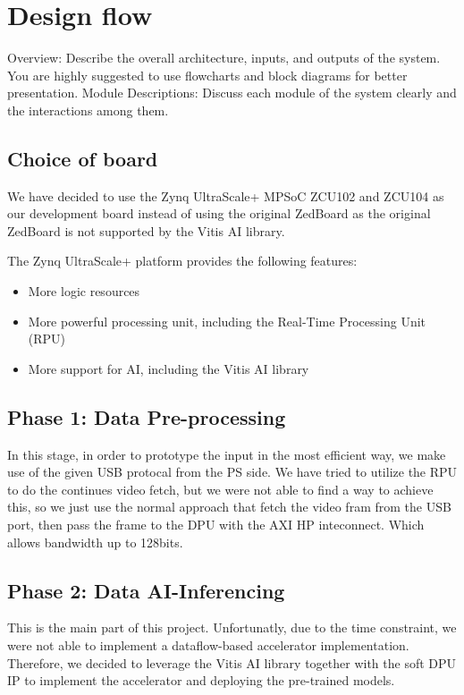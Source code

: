 \documentclass[12pt, a4paper]{article}
\begin{document}
\section{Design flow}
Overview: Describe the overall architecture, inputs, and outputs of the
system.
You are highly suggested to use flowcharts and block diagrams for
better presentation.
Module Descriptions: Discuss each module of the system clearly and
the interactions among them.

\subsection{Choice of board}
We have decided to use the Zynq UltraScale+ MPSoC ZCU102 and ZCU104 \cite{zynq_ultrascale_swdev} as our development board instead of 
using the original ZedBoard \cite{zedboard_docs} as the original ZedBoard is not supported by the Vitis AI library.

The Zynq UltraScale+ platform provides the following features:
\begin{itemize}
    \item More logic resources
    \item More powerful processing unit, including the Real-Time Processing Unit (RPU)
    \item More support for AI, including the Vitis AI library
\end{itemize}

\subsection{Phase 1: Data Pre-processing}

In this stage, in order to prototype the input in the most efficient way, we make use of the given USB protocal from the PS side. 
We have tried to utilize the RPU to do the continues video fetch, but we were not able to find a way to achieve this, so we just use the normal approach that fetch the video fram from the USB port, 
then pass the frame to the DPU with the AXI HP inteconnect. Which allows bandwidth up to 128bits. 


\subsection{Phase 2: Data AI-Inferencing}
This is the main part of this project. Unfortunatly, due to the time constraint, we were not able to implement a dataflow-based accelerator implementation. 
Therefore, we decided to leverage the Vitis AI library together with the soft DPU IP to implement the accelerator and deploying the pre-trained models. 
\end{document}
